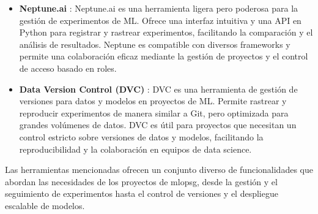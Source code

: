 \begin{itemize}
    \item \textbf{Neptune.ai} \cite{neptune}: Neptune.ai es una herramienta ligera pero poderosa para la gestión de experimentos de ML. Ofrece una interfaz intuitiva y una API en Python para registrar y rastrear experimentos, facilitando la comparación y el análisis de resultados. Neptune es compatible con diversos frameworks y permite una colaboración eficaz mediante la gestión de proyectos y el control de acceso basado en roles.

    \item \textbf{Data Version Control (DVC)} \cite{dvc}: DVC es una herramienta de gestión de versiones para datos y modelos en proyectos de ML. Permite rastrear y reproducir experimentos de manera similar a Git, pero optimizada para grandes volúmenes de datos. DVC es útil para proyectos que necesitan un control estricto sobre versiones de datos y modelos, facilitando la reproducibilidad y la colaboración en equipos de data science.
\end{itemize}
Las herramientas mencionadas ofrecen un conjunto diverso de funcionalidades que abordan las necesidades de los proyectos de \Gls{mlopsg}, desde la gestión y el seguimiento de experimentos hasta el control de versiones y el despliegue escalable de modelos.



